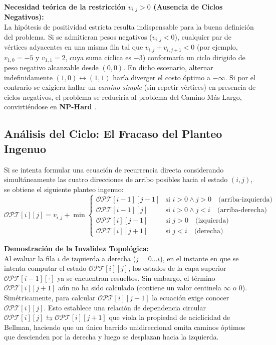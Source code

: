 \textbf{Necesidad teórica de la restricción $v_{i,j} > 0$ (Ausencia de Ciclos Negativos):} \\
La hipótesis de positividad estricta resulta indispensable para la buena definición del problema. Si se admitieran pesos negativos ($v_{i,j} < 0$), cualquier par de vértices adyacentes en una misma fila tal que $v_{i,j} + v_{i,j+1} < 0$ (por ejemplo, $v_{1,0} = -5$ y $v_{1,1} = 2$, cuya suma cíclica es $-3$) conformaría un ciclo dirigido de peso negativo alcanzable desde $(0,0)$. En dicho escenario, alternar indefinidamente $(1,0) \leftrightarrow (1,1)$ haría diverger el costo óptimo a $-\infty$. Si por el contrario se exigiera hallar un \textit{camino simple} (sin repetir vértices) en presencia de ciclos negativos, el problema se reduciría al problema del Camino Más Largo, convirtiéndose en \textbf{NP-Hard} \parencite{cormen2022}.

\subsection{Análisis del Ciclo: El Fracaso del Planteo Ingenuo}

Si se intenta formular una ecuación de recurrencia directa considerando simultáneamente las cuatro direcciones de arribo posibles hacia el estado $(i,j)$, se obtiene el siguiente planteo ingenuo:
\[
    \mathcal{OPT}[i][j] = v_{i,j} + \min \begin{cases}
        \mathcal{OPT}[i-1][j-1] & \text{si } i > 0 \land j > 0 \quad \text{(arriba-izquierda)} \\
        \mathcal{OPT}[i-1][j]   & \text{si } i > 0 \land j < i \quad \text{(arriba-derecha)} \\
        \mathcal{OPT}[i][j-1]   & \text{si } j > 0 \quad \text{(izquierda)} \\
        \mathcal{OPT}[i][j+1]   & \text{si } j < i \quad \text{(derecha)}
    \end{cases}
\]

\textbf{Demostración de la Invalidez Topológica:} \\
Al evaluar la fila $i$ de izquierda a derecha ($j = 0 \dots i$), en el instante en que se intenta computar el estado $\mathcal{OPT}[i][j]$, los estados de la capa superior $\mathcal{OPT}[i-1][\cdot]$ ya se encuentran resueltos. Sin embargo, el término $\mathcal{OPT}[i][j+1]$ aún no ha sido calculado (contiene un valor centinela $\infty$ o $0$). Simétricamente, para calcular $\mathcal{OPT}[i][j+1]$ la ecuación exige conocer $\mathcal{OPT}[i][j]$. Esto establece una relación de dependencia circular $\mathcal{OPT}[i][j] \leftrightarrows \mathcal{OPT}[i][j+1]$ que viola la propiedad de aciclicidad de Bellman, haciendo que un único barrido unidireccional omita caminos óptimos que descienden por la derecha y luego se desplazan hacia la izquierda.


